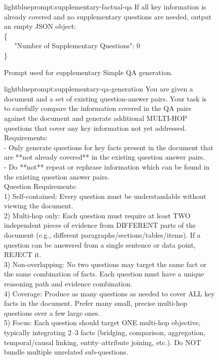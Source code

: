 \documentclass{applemlr}
\numberwithin{equation}{section}
\begin{document}
\begin{figure}[t]
\begin{minipage}{0.95\textwidth}
\begin{promptbox}[\color{black}{Prompt for Supplementary Simple QA Generation}]{lightblue}{prompt:supplementary-factual-qa}
If all key information is already covered and no supplementary questions are needed, output an empty JSON object: \\
\{ \\
\ \ \ "Number of Supplementary Questions": 0 \\
\} 
\end{promptbox}
\end{minipage}
\caption{Prompt used for supplementary Simple QA generation.}
\label{prompt_supplementary_factual_qa_generation}
\end{figure}

\begin{figure}[t]
\centering
\begin{minipage}{1\textwidth}
\begin{promptbox}[\color{black}{Prompt for Supplementary Complex QA Generation}]{lightblue}{prompt:supplementary-qa-generation}
\label{temp:supplementary_qa_generation_prompt}
\small
\ttfamily
You are given a document and a set of existing question-answer pairs. Your task is to carefully compare the information covered in the QA pairs against the document and generate additional MULTI-HOP questions that cover any key information not yet addressed. \\
Requirements: \\
- Only generate questions for key facts present in the document that are **not already covered** in the existing question answer pairs. \\
- Do **not** repeat or rephrase information which can be found in the existing question answer pairs. \\
Question Requirements: \\
1) Self-contained: Every question must be understandable without viewing the document. \\
2) Multi-hop only: Each question must require at least TWO independent pieces of evidence from DIFFERENT parts of the document (e.g., different paragraphs/sections/tables/items). If a question can be answered from a single sentence or data point, REJECT it. \\
3) Non-overlapping: No two questions may target the same fact or the same combination of facts. Each question must have a unique reasoning path and evidence combination. \\
4) Coverage: Produce as many questions as needed to cover ALL key facts in the document. Prefer many small, precise multi-hop questions over a few large ones. \\
5) Focus: Each question should target ONE multi-hop objective, typically integrating 2–3 facts (bridging, comparison, aggregation, temporal/causal linking, entity–attribute joining, etc.). Do NOT bundle multiple unrelated sub-questions. \\

\end{promptbox}
\end{minipage}
\end{figure}
\end{document}

